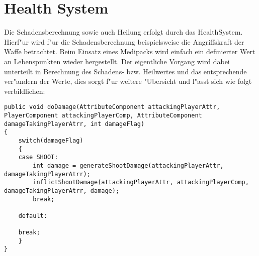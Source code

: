 \section{Health System}

Die Schadensberechnung sowie auch Heilung erfolgt durch das HealthSystem. Hierf"ur wird f"ur die Schadensberechnung beispielsweise die Angriffskraft der Waffe betrachtet. Beim Einsatz eines Medipacks wird einfach ein definierter Wert an Lebenspunkten wieder hergestellt.
Der eigentliche Vorgang wird dabei unterteilt in Berechnung des Schadens- bzw. Heilwertes und das entsprechende ver"andern der Werte, dies sorgt f"ur weitere "Ubersicht und l"asst sich wie folgt verbildlichen:

\begin{lstlisting}[breaklines = true]
public void doDamage(AttributeComponent attackingPlayerAttr, PlayerComponent attackingPlayerComp, AttributeComponent damageTakingPlayerAtrr, int damageFlag)
{
	switch(damageFlag)
	{
	case SHOOT:
		int damage = generateShootDamage(attackingPlayerAttr, damageTakingPlayerAtrr);
		inflictShootDamage(attackingPlayerAttr, attackingPlayerComp, damageTakingPlayerAtrr, damage);                    
		break;

	default:

	break;
	}
}
\end{lstlisting}